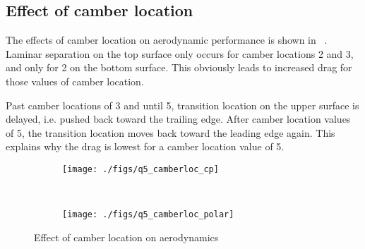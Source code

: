 \subsection{Effect of camber location}
The effects of camber location on aerodynamic performance is shown in
~. Laminar separation on the top surface only
occurs for camber locations 2 and 3, and only for 2 on the bottom surface.
This obviously leads to increased drag for those values of camber location.

Past camber locations of 3 and until 5, transition location on the
upper surface is delayed, i.e.
pushed back toward the trailing edge. After camber location values of 5, the
transition location moves back toward the leading edge again. This explains why the drag
is lowest for a camber location value of 5.
\begin{figure}[H]
    \centering
    \begin{subfigure}{0.8\textwidth}
    \texttt{[image: ./figs/q5\_camberloc\_cp]}
    \end{subfigure}
    \\
    \begin{subfigure}{0.8\textwidth}
    \texttt{[image: ./figs/q5\_camberloc\_polar]}
    \end{subfigure}
    \caption{Effect of camber location on aerodynamics}\label{fig:q5_camberloc}
\end{figure}
